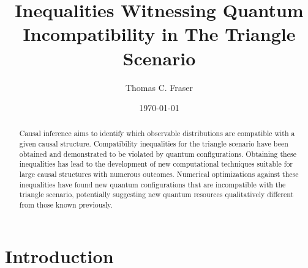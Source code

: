 \documentclass[aps, 10pt, english, twoside, pra, nofootinbib, longbibliography]{revtex4-1}
\theoremstyle{plain}
\theoremstyle{definition}
\theoremstyle{remark}
\begin{document}
    \title{Inequalities Witnessing Quantum Incompatibility in The Triangle Scenario}
    \author{Thomas C. Fraser}
    \date{\today}
    \begin{abstract}
        Causal inference aims to identify which observable distributions are compatible with a given causal structure. Compatibility inequalities for the triangle scenario have been obtained and demonstrated to be violated by quantum configurations. Obtaining these inequalities has lead to the development of new computational techniques suitable for large causal structures with numerous outcomes. Numerical optimizations against these inequalities have found new quantum configurations that are incompatible with the triangle scenario, potentially suggesting new quantum resources qualitatively different from those known previously. 
    \end{abstract}
    \maketitle
    \tableofcontents

    \section{Introduction}
\end{document}
